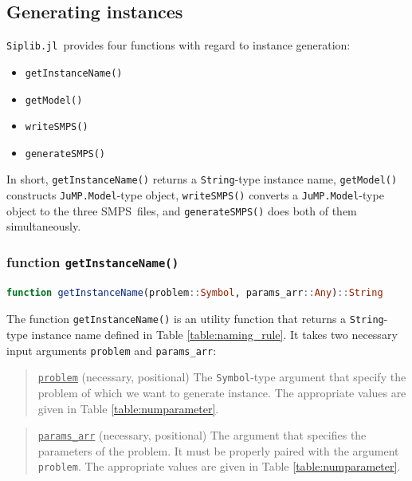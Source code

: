 \documentclass{hitec}
\newcommand{\smps}{\textsf{SMPS}}
\newcommand{\jumpmodel}{\texttt{JuMP.Model}}
\newcommand{\siplibjl}{\texttt{Siplib.jl}}
\begin{document}
	\subsection{Generating instances}
	\siplibjl\ provides four functions with regard to instance generation:
	\begin{itemize}
		\item \texttt{getInstanceName()}
		\item \texttt{getModel()}
		\item \texttt{writeSMPS()}
		\item \texttt{generateSMPS()}
	\end{itemize}
	 In short, \texttt{getInstanceName()} returns a \texttt{String}-type instance name, \texttt{getModel()} constructs \jumpmodel-type object, \texttt{writeSMPS()} converts a \jumpmodel-type object to the three \smps\ files, and \texttt{generateSMPS()} does both of them simultaneously.
	\subsubsection{function \texttt{getInstanceName()}}
	\begin{lstlisting}[frame=single,language=julia]
	function getInstanceName(problem::Symbol, params_arr::Any)::String
	\end{lstlisting}		
	The function \texttt{getInstanceName()} is an utility function that returns a \texttt{String}-type instance name defined in Table \ref{table:naming_rule}. It takes two necessary input arguments \texttt{problem} and \texttt{params\_arr}:
	\begin{quote}
		\noindent\underline{\texttt{problem}} (necessary, positional) The \texttt{Symbol}-type argument that specify the problem of which we want to generate instance. The appropriate values are given in Table \ref{table:numparameter}. 
	\end{quote}

	\begin{quote}
		\noindent\underline{\texttt{params\_arr}} (necessary, positional) The argument that specifies the parameters of the problem. It must be properly paired with the argument \texttt{problem}. The appropriate values are given in Table \ref{table:numparameter}. 
	\end{quote}
\end{document}
